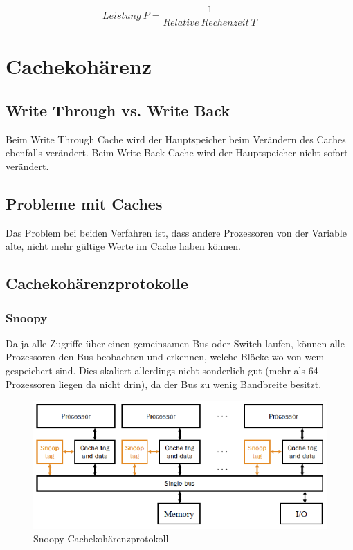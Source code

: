 \begin{equation}\label{eq:amdahl_leistung}
	Leistung\ P = \frac{1}{Relative\ Rechenzeit\ T }
\end{equation}

\section{Cachekohärenz}

\subsection{Write Through vs. Write Back}
Beim Write Through Cache wird der Hauptspeicher beim Verändern des Caches ebenfalls verändert. Beim Write Back Cache wird der Hauptspeicher nicht sofort verändert.
 
\subsection{Probleme mit Caches}
Das Problem bei beiden Verfahren ist, dass andere Prozessoren von der Variable alte, nicht mehr gültige Werte im Cache haben können.

\subsection{Cachekohärenzprotokolle}

\subsubsection{Snoopy}
Da ja alle Zugriffe über einen gemeinsamen Bus oder Switch laufen, können alle Prozessoren den Bus beobachten und erkennen, welche Blöcke wo von wem gespeichert sind. Dies skaliert allerdings nicht sonderlich gut (mehr als 64 Prozessoren liegen da nicht drin), da der Bus zu wenig Bandbreite besitzt.

\begin{figure}
\centering
\includegraphics[width=0.7\linewidth]{fig/snoopy}
\caption{Snoopy Cachekohärenzprotokoll}
\label{fig:snoopy}
\end{figure}

